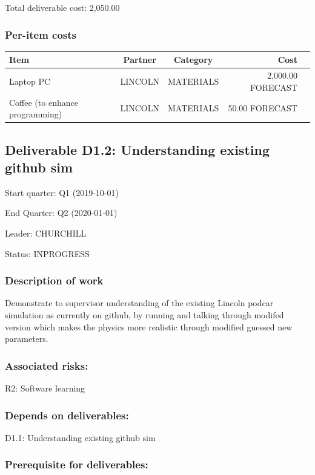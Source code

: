 \documentclass[english]{article}
\begin{document}
Total deliverable cost:  2,050.00

\subsubsection*{Per-item costs}

\begin{tabular}{ | l | c | c | r | c | }
\hline
 Item & Partner & Category & Cost \\ 
 \hline
 Laptop PC & LINCOLN & MATERIALS & 2,000.00 FORECAST\\ 
Coffee (to enhance programming) & LINCOLN & MATERIALS & 50.00 FORECAST\\ 
\hline
 \end{tabular}

\newpage\subsection*{Deliverable D1.2: Understanding existing github sim}

Start quarter: Q1 (2019-10-01) 
 
 End Quarter: Q2 (2020-01-01) 

 Leader: CHURCHILL

  Status: INPROGRESS 

 \subsubsection*{Description of work}

Demonstrate to supervisor understanding of the existing Lincoln podcar simulation as currently on github, by running and talking through modifed version which makes the physics more realistic through modified guessed new parameters.

\subsubsection*{Associated risks:}

R2: Software learning

\subsubsection*{Depends on deliverables:}

D1.1: Understanding existing github sim



\subsubsection*{Prerequisite for deliverables:}
\end{document}

